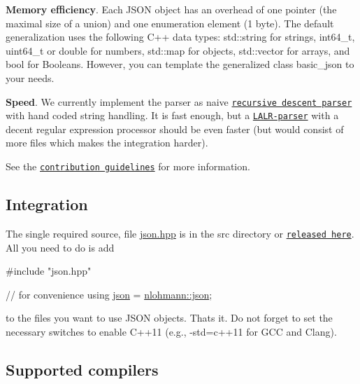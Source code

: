 \begin{DoxyItemize}
\item {\bfseries Memory efficiency}. Each J\+S\+ON object has an overhead of one pointer (the maximal size of a union) and one enumeration element (1 byte). The default generalization uses the following C++ data types\+: {\ttfamily std\+::string} for strings, {\ttfamily int64\+\_\+t}, {\ttfamily uint64\+\_\+t} or {\ttfamily double} for numbers, {\ttfamily std\+::map} for objects, {\ttfamily std\+::vector} for arrays, and {\ttfamily bool} for Booleans. However, you can template the generalized class {\ttfamily basic\+\_\+json} to your needs.
\item {\bfseries Speed}. We currently implement the parser as naive \href{http://en.wikipedia.org/wiki/Recursive_descent_parser}{\tt recursive descent parser} with hand coded string handling. It is fast enough, but a \href{http://en.wikipedia.org/wiki/LALR_parser}{\tt L\+A\+L\+R-\/parser} with a decent regular expression processor should be even faster (but would consist of more files which makes the integration harder).
\end{DoxyItemize}

See the \href{https://github.com/nlohmann/json/blob/master/.github/CONTRIBUTING.md#please-dont}{\tt contribution guidelines} for more information.

\subsection*{Integration}

The single required source, file {\ttfamily \hyperlink{a00257_source}{json.\+hpp}} is in the {\ttfamily src} directory or \href{https://github.com/nlohmann/json/releases}{\tt released here}. All you need to do is add


\begin{DoxyCode}
\textcolor{preprocessor}{#include "json.hpp"}

\textcolor{comment}{// for convenience}
\textcolor{keyword}{using} \hyperlink{a00025}{json} = \hyperlink{a00434_a2bfd99e845a2e5cd90aeaf1b1431f474}{nlohmann::json};
\end{DoxyCode}


to the files you want to use J\+S\+ON objects. That\textquotesingle{}s it. Do not forget to set the necessary switches to enable C++11 (e.\+g., {\ttfamily -\/std=c++11} for G\+CC and Clang).

\subsection*{Supported compilers}

